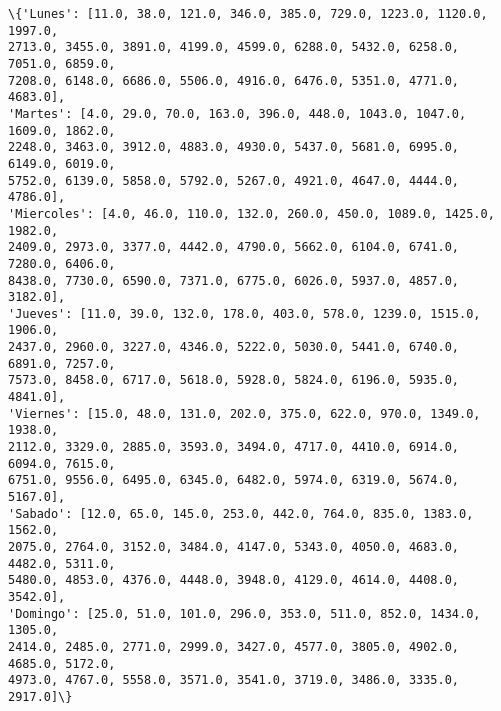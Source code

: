 \documentclass[11pt]{article}
\begin{document}
    \begin{Verbatim}[commandchars=\\\{\}]
\{'Lunes': [11.0, 38.0, 121.0, 346.0, 385.0, 729.0, 1223.0, 1120.0, 1997.0,
2713.0, 3455.0, 3891.0, 4199.0, 4599.0, 6288.0, 5432.0, 6258.0, 7051.0, 6859.0,
7208.0, 6148.0, 6686.0, 5506.0, 4916.0, 6476.0, 5351.0, 4771.0, 4683.0],
'Martes': [4.0, 29.0, 70.0, 163.0, 396.0, 448.0, 1043.0, 1047.0, 1609.0, 1862.0,
2248.0, 3463.0, 3912.0, 4883.0, 4930.0, 5437.0, 5681.0, 6995.0, 6149.0, 6019.0,
5752.0, 6139.0, 5858.0, 5792.0, 5267.0, 4921.0, 4647.0, 4444.0, 4786.0],
'Miercoles': [4.0, 46.0, 110.0, 132.0, 260.0, 450.0, 1089.0, 1425.0, 1982.0,
2409.0, 2973.0, 3377.0, 4442.0, 4790.0, 5662.0, 6104.0, 6741.0, 7280.0, 6406.0,
8438.0, 7730.0, 6590.0, 7371.0, 6775.0, 6026.0, 5937.0, 4857.0, 3182.0],
'Jueves': [11.0, 39.0, 132.0, 178.0, 403.0, 578.0, 1239.0, 1515.0, 1906.0,
2437.0, 2960.0, 3227.0, 4346.0, 5222.0, 5030.0, 5441.0, 6740.0, 6891.0, 7257.0,
7573.0, 8458.0, 6717.0, 5618.0, 5928.0, 5824.0, 6196.0, 5935.0, 4841.0],
'Viernes': [15.0, 48.0, 131.0, 202.0, 375.0, 622.0, 970.0, 1349.0, 1938.0,
2112.0, 3329.0, 2885.0, 3593.0, 3494.0, 4717.0, 4410.0, 6914.0, 6094.0, 7615.0,
6751.0, 9556.0, 6495.0, 6345.0, 6482.0, 5974.0, 6319.0, 5674.0, 5167.0],
'Sabado': [12.0, 65.0, 145.0, 253.0, 442.0, 764.0, 835.0, 1383.0, 1562.0,
2075.0, 2764.0, 3152.0, 3484.0, 4147.0, 5343.0, 4050.0, 4683.0, 4482.0, 5311.0,
5480.0, 4853.0, 4376.0, 4448.0, 3948.0, 4129.0, 4614.0, 4408.0, 3542.0],
'Domingo': [25.0, 51.0, 101.0, 296.0, 353.0, 511.0, 852.0, 1434.0, 1305.0,
2414.0, 2485.0, 2771.0, 2999.0, 3427.0, 4577.0, 3805.0, 4902.0, 4685.0, 5172.0,
4973.0, 4767.0, 5558.0, 3571.0, 3541.0, 3719.0, 3486.0, 3335.0, 2917.0]\}
    \end{Verbatim}
\end{document}
